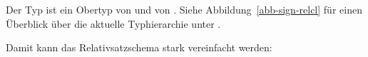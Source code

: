 \z

\noindent
Der Typ  ist ein Obertyp von  und von
. Siehe Abbildung~\vref{abb-sign-relcl} für einen
Überblick über die aktuelle Typhierarchie unter . 
%

Damit kann das Relativsatzschema stark vereinfacht werden:
\begin{schema}
\label{rs-schema-struk-mit-Vererbung}
 \impl\\
\end{schema}

